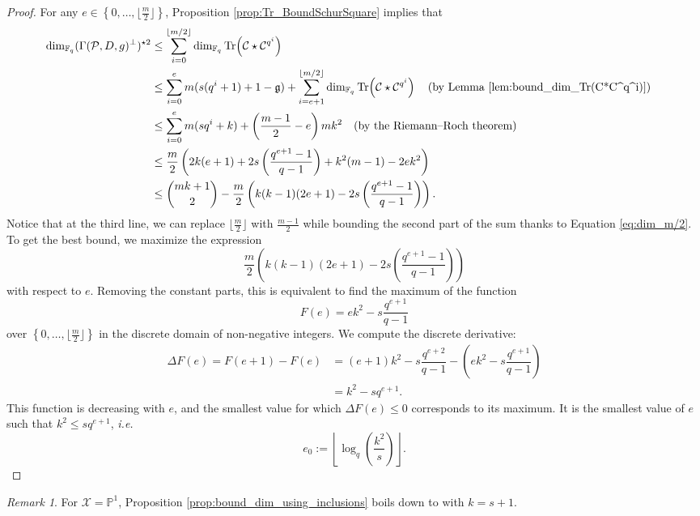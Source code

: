 \documentclass[a4paper]{amsart}
\theoremstyle{definition}
\theoremstyle{remark}
\newtheorem{remark}[thm]{Remark}
\DeclareMathOperator{\trace}{Tr}
\newcommand{\calP}{\mathcal{P}}
\newcommand{\calC}{\mathcal{C}}
\newcommand{\calX}{\mathcal{X}}
\newcommand{\fq}{\mathbb{F}_{q}}
\newcommand{\PP}{\mathbb{P}}
\newcommand{\Tr}[1]{\trace\!\left(#1\right)}
\newcommand{\set}[1]{\left\{#1\right\}}
\begin{document}
\begin{proof}
 For any $e \in \set{0,\dots,\lfloor \frac{m}{2} \rfloor}$, Proposition \ref{prop:Tr_BoundSchurSquare} implies that
    \begin{align*}
        \dim_{\fq}(\Gamma(\calP,D,g)^{\perp})^{\star 2}
        & \leq \sum\limits_{i=0}^{\lfloor m/2 \rfloor} \dim_{\fq} \Tr{\calC \star \calC^{q^i}} &\\
        & \leq \sum\limits_{i=0}^{e} m(s(q^i+1)+1-\mathfrak{g})  + \sum\limits_{i=e+1}^{\lfloor m/2 \rfloor} \dim_{\fq} \Tr{\calC \star \calC^{q^i}} \quad \text{(by Lemma \ref{lem:bound_dim_Tr(C*C^q^i)})}\\
        & \leq \sum\limits_{i=0}^{e} m(sq^i+k) + \left( \frac{m-1}{2} -e \right)mk^2 \quad \text{(by the Riemann--Roch theorem)}\\
        & \leq \frac{m}{2}\left(2k(e+1)+2s\left(\dfrac{q^{e+1}-1}{q-1}\right)+k^2(m-1)-2ek^2  \right) &\\
        & \leq \binom{mk+1}{2} -  \dfrac{m}{2}\left(k(k-1)(2e+1)-2s\left(\dfrac{q^{e+1}-1}{q-1}\right)\right).&
    \end{align*}
    Notice that at the third line, we can replace $\lfloor \frac{m}{2} \rfloor$ with $\frac{m-1}{2}$ while bounding the second part of the sum thanks to Equation \eqref{eq:dim_m/2}.
To get the best bound, we maximize the expression $$ \dfrac{m}{2}\left(k(k-1)(2e+1)-2s\left(\dfrac{q^{e+1}-1}{q-1}\right)\right)$$ with respect to $e$. Removing the constant parts, this is equivalent to find the maximum of the function
$$F(e) = ek^2-s\dfrac{q^{e+1}}{q-1}$$
over $\set{0,\dots,\lfloor \frac{m}{2} \rfloor}$ in the discrete domain of non-negative integers.  
We compute the discrete derivative:
\begin{align*}
    \Delta F(e) = F(e+1)-F(e) &= (e+1)k^2-s\dfrac{q^{e+2}}{q-1} - \left(ek^2-s\dfrac{q^{e+1}}{q-1}\right) \\
                              &= k^2 - sq^{e+1}.
\end{align*}
This function is decreasing with $e$, and the smallest value for which $\Delta F(e) \leq 0$ corresponds to its maximum. It is the smallest value of $e$ such that $k^2 \leq sq^{e+1}$, \emph{i.e.}
$$e_0 :=  \left\lfloor \log_q\left(\dfrac{k^2}{s}\right)\right\rfloor.$$
\end{proof}

\begin{remark}
	For $\calX=\PP^1$, Proposition \ref{prop:bound_dim_using_inclusions} boils down to \cite[Theorem 19]{MT21} with $k=s+1$.
\end{remark}
\end{document}
